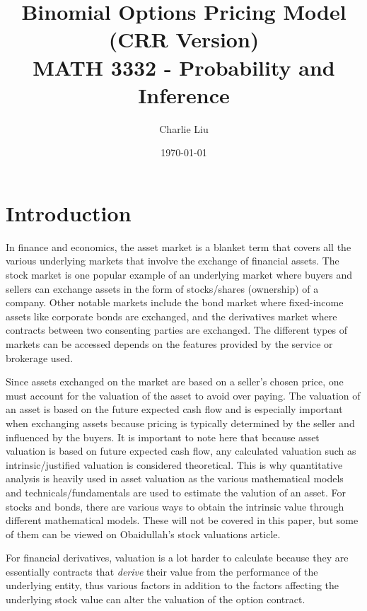 \documentclass[12pt, letterpaper]{article}
\begin{document}
\setlength\parindent{1cm}

\title{Binomial Options Pricing Model (CRR Version)\\
\large MATH 3332 - Probability and Inference}
\author{Charlie Liu}
\date{\today}
\maketitle

\section*{Introduction}

In finance and economics, the asset market is a blanket term that covers all the various underlying markets that involve the exchange of financial assets.
The stock market is one popular example of an underlying market where buyers and sellers can exchange assets in the form of stocks/shares (ownership) of a company.
Other notable markets include the bond market where fixed-income assets like corporate bonds are exchanged, and the derivatives market where contracts between two consenting parties are exchanged.
The different types of markets can be accessed depends on the features provided by the service or brokerage used.

\medskip

Since assets exchanged on the market are based on a seller's chosen price, one must account for the valuation of the asset to avoid over paying.
The valuation of an asset is based on the future expected cash flow\cite{damodaran} and is especially important when exchanging assets because pricing is typically determined by the seller and influenced by the buyers.
It is important to note here that because asset valuation is based on future expected cash flow, any calculated valuation such as intrinsic/justified valuation is considered theoretical.
This is why quantitative analysis is heavily used in asset valuation as the various mathematical models and technicals/fundamentals are used to estimate the valution of an asset.
For stocks and bonds, there are various ways to obtain the intrinsic value through different mathematical models.
These will not be covered in this paper, but some of them can be viewed on Obaidullah's stock valuations article\cite{obaidullahxplaind}.

\medskip

For financial derivatives, valuation is a lot harder to calculate because they are essentially contracts that \textit{derive} their value from the performance of the underlying entity\cite{derivativefinancewikipedia}, thus various factors in addition to the factors affecting the underlying stock value can alter the valuation of the option contract. 
\end{document}
